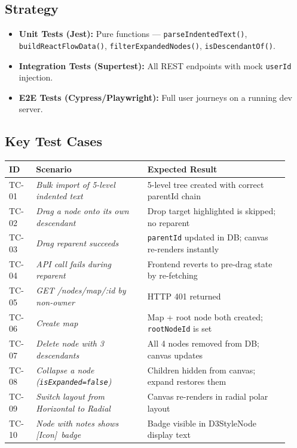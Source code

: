 \documentclass[12pt, a4paper]{article}
\begin{document}
\subsection{Strategy}
\begin{itemize}[noitemsep]
  \item \textbf{Unit Tests (Jest):} Pure functions — \texttt{parseIndentedText()}, \texttt{buildReactFlowData()}, \texttt{filterExpandedNodes()}, \texttt{isDescendantOf()}.
  \item \textbf{Integration Tests (Supertest):} All REST endpoints with mock \texttt{userId} injection.
  \item \textbf{E2E Tests (Cypress/Playwright):} Full user journeys on a running dev server.
\end{itemize}

\subsection{Key Test Cases}
\begin{longtable}{p{0.09\linewidth} p{0.37\linewidth} p{0.47\linewidth}}
\toprule
\textbf{ID} & \textbf{Scenario} & \textbf{Expected Result} \\
\midrule
\endfirsthead
TC-01 & \textit{Bulk import of 5-level indented text} & 5-level tree created with correct parentId chain \\
TC-02 & \textit{Drag a node onto its own descendant} & Drop target highlighted is skipped; no reparent \\
TC-03 & \textit{Drag reparent succeeds} & \texttt{parentId} updated in DB; canvas re-renders instantly \\
TC-04 & \textit{API call fails during reparent} & Frontend reverts to pre-drag state by re-fetching \\
TC-05 & \textit{GET /nodes/map/:id by non-owner} & HTTP 401 returned \\
TC-06 & \textit{Create map} & Map + root node both created; \texttt{rootNodeId} is set \\
TC-07 & \textit{Delete node with 3 descendants} & All 4 nodes removed from DB; canvas updates \\
TC-08 & \textit{Collapse a node (\texttt{isExpanded=false})} & Children hidden from canvas; expand restores them \\
TC-09 & \textit{Switch layout from Horizontal to Radial} & Canvas re-renders in radial polar layout \\
TC-10 & \textit{Node with notes shows [Icon]\ badge} & Badge visible in D3StyleNode display text \\
\bottomrule
\end{longtable}
\end{document}
